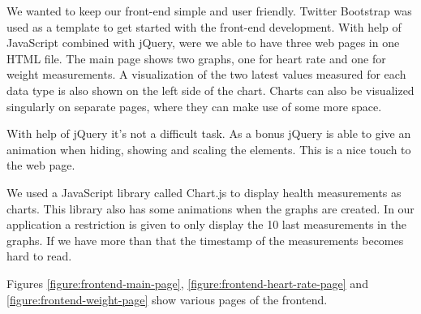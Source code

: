 We wanted to keep our front-end simple and user friendly.
Twitter Bootstrap was used as a template to get started with the front-end development.
With help of JavaScript combined with jQuery, were we able to have three web pages in one HTML file. 
The main page shows two graphs, one for heart rate and one for weight measurements. 
A visualization of the two latest values measured for each data type is also shown on the left side of the chart.
Charts can also be visualized singularly on separate pages, where they can make use of some more space.

With help of jQuery it's not a difficult task.
As a bonus jQuery is able to give an animation when hiding, showing and scaling the elements.
This is a nice touch to the web page.

We used a JavaScript library called Chart.js to display health measurements as charts. 
This library also has some animations when the graphs are created.
In our application a restriction is given to only display the 10 last measurements in the graphs.
If we have more than that the timestamp of the measurements becomes hard to read.

Figures \ref{figure:frontend-main-page}, \ref{figure:frontend-heart-rate-page} and \ref{figure:frontend-weight-page}
show various pages of the frontend.


